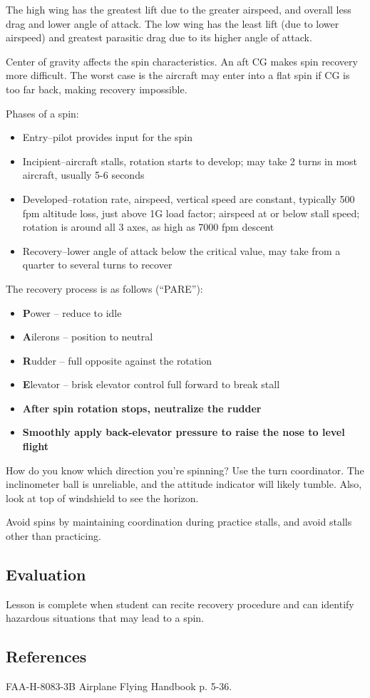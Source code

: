 The high wing has the greatest lift due to the greater airspeed, and overall
less drag and lower angle of attack. The low wing has the least lift (due to
lower airspeed) and greatest parasitic drag due to its higher angle of attack.

Center of gravity affects the spin characteristics. An aft CG makes spin
recovery more difficult. The worst case is the aircraft may enter into a flat
spin if CG is too far back, making recovery impossible.

Phases of a spin:
\begin{itemize}
  \item Entry--pilot provides input for the spin
  \item Incipient--aircraft stalls, rotation starts to develop; may take 2
    turns in most aircraft, usually 5-6 seconds
  \item Developed--rotation rate, airspeed, vertical speed are constant,
    typically 500 fpm altitude loss, just above 1G load factor; airspeed at or
    below stall speed; rotation is around all 3 axes, as high as 7000 fpm
    descent
  \item Recovery--lower angle of attack below the critical value, may take from a
    quarter to several turns to recover
\end{itemize}

The recovery process is as follows (``PARE''):
\begin{itemize}
  \item \textbf{P}ower -- reduce to idle
  \item \textbf{A}ilerons -- position to neutral
  \item \textbf{R}udder -- full opposite against the rotation
  \item \textbf{E}levator -- brisk elevator control full forward to break stall
  \item \textbf{After spin rotation stops, neutralize the rudder}
  \item \textbf{Smoothly apply back-elevator pressure to raise the nose to
    level flight}
\end{itemize}

How do you know which direction you're spinning? Use the turn coordinator. The
inclinometer ball is unreliable, and the attitude indicator will likely tumble.
Also, look at top of windshield to see the horizon.

Avoid spins by maintaining coordination during practice stalls, and avoid
stalls other than practicing.

\subsection{Evaluation}

Lesson is complete when student can recite recovery procedure and can identify
hazardous situations that may lead to a spin.

\subsection{References}

FAA-H-8083-3B Airplane Flying Handbook p. 5-36.


